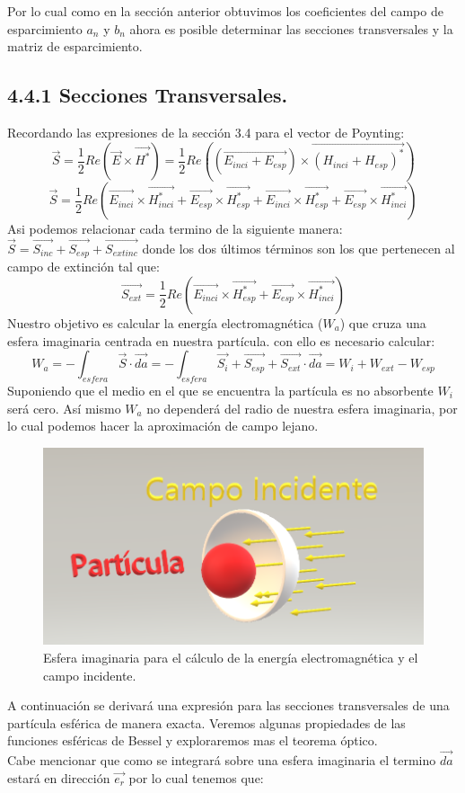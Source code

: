\documentclass[letterpaper, 11pt]{article}
\begin{document}
Por lo cual como en la sección anterior obtuvimos los coeficientes del campo de esparcimiento $a_n$ y $b_n$ ahora es posible determinar las secciones transversales y la matriz de esparcimiento.
\subsection*{4.4.1 Secciones Transversales.}
Recordando las expresiones de la sección 3.4 para el vector de Poynting:
\begin{equation}
    \vec{S}=\frac{1}{2}Re \left ( \vec{E} \times \vec{H^*}\right) = \frac{1}{2}Re \left( (\vec{E_{inci}+E_{esp}}) \times \vec{(H_{inci}+H_{esp})^*} \right)
\end{equation}
\begin{equation}
    \vec{S}=\frac{1}{2}Re \left ( \vec{E_{inci}} \times \vec{H_{inci}^*}+\vec{E_{esp}} \times \vec{H_{esp}^*}+\vec{E_{inci}} \times \vec{H_{esp}^*}+\vec{E_{esp}} \times \vec{H_{inci}^*}\right)
\end{equation}
Asi podemos relacionar cada termino de la siguiente manera: $\vec{S}=\vec{S_{inc}}+\vec{S_{esp}}+\vec{S_{extinc}}$ donde los dos últimos términos son los que pertenecen al campo de extinción tal que:
\begin{equation}
    \vec{S_{ext}}= \frac{1}{2}Re \left ( \vec{E_{inci}} \times \vec{H_{esp}^*}+\vec{E_{esp}} \times \vec{H_{inci}^*}\right)
\end{equation}
Nuestro objetivo es calcular la energía electromagnética ($W_a$) que cruza una esfera imaginaria centrada en nuestra partícula. con ello es necesario calcular:
\begin{equation}
    W_a= -\int_{esfera} \vec{S} \cdot \vec{da} = -\int_{esfera} \vec{S_i}+\vec{S_{esp}}+\vec{S_{ext}} \cdot \vec{da}=W_i+W_{ext}-W_{esp}
\end{equation}
Suponiendo que el medio en el que se encuentra la partícula es no absorbente $W_i$ será cero. Así mismo $W_a$ no dependerá del radio de nuestra esfera imaginaria, por lo cual podemos hacer la aproximación de campo lejano.
\begin{figure}[hbt]
\centering
\includegraphics[width=.7\textwidth]{campoincidente.png}
\caption{Esfera imaginaria para el cálculo de la energía electromagnética y el campo incidente.}
\label{Fig 4.4}
\end{figure}
A continuación se derivará una expresión para las secciones transversales de una partícula esférica de manera exacta. Veremos algunas propiedades de las funciones esféricas de Bessel y exploraremos mas el teorema óptico.\\
Cabe mencionar que como se integrará sobre una esfera imaginaria el termino $\vec{da}$ estará en dirección $\vec{e_r}$ por lo cual tenemos que:
\end{document}
